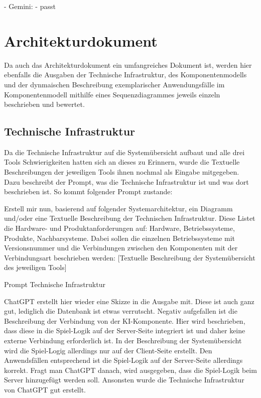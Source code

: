 - Gemini:
    - passt


\section{Architekturdokument}  \label{CompArchitekturdokument}

Da auch das Architekturdokument ein umfangreiches Dokument ist, werden hier ebenfalls die Ausgaben der Technische Infrastruktur, des Komponentenmodells 
und der dynmaischen Beschreibung exemplarischer Anwendungsfälle im Komponentenmodell mithilfe eines Sequenzdiagrammes jeweils einzeln beschrieben und bewertet.

\subsection*{Technische Infrastruktur}

Da die Technische Infrastruktur auf die Systemübersicht aufbaut und alle drei Tools Schwierigkeiten hatten sich an dieses zu Erinnern, wurde die Textuelle 
Beschreibungen der jeweiligen Tools ihnen nochmal als Eingabe mitgegeben. Dazu beschreibt der Prompt, was die Technische Infrastruktur ist und was dort 
beschrieben ist. So kommt folgender Prompt zustande:

\begin{prompt}[H]
    \begin{tcolorbox}[colback=gray!20, colframe=gray!20, boxrule=0pt, sharp corners] 
        Erstell mir nun, basierend auf folgender Systemarchitektur, ein Diagramm und/oder eine Textuelle Beschreibung der Technischen Infrastruktur. 
        Diese Listet die Hardware- und Produktanforderungen auf: Hardware, Betriebssysteme, Produkte, Nachbarsysteme. Dabei sollen die einzelnen 
        Betriebssysteme mit Versionsnummer und die Verbindungen zwischen den Komponenten mit der Verbindungsart beschrieben werden: [Textuelle 
        Beschreibung der Systemübersicht des jeweiligen Tools]
        \vfill
    \end{tcolorbox}
    \caption{Prompt Technische Infrastruktur}
    \label{Prompt Technische Infrastruktur}
\end{prompt}

ChatGPT erstellt hier wieder eine Skizze in die Ausgabe mit. Diese ist auch ganz gut, lediglich die Datenbank ist etwas verrutscht. Negativ aufgefallen
ist die Beschreibung der Verbindung von der KI-Komponente. Hier wird beschrieben, dass diese in die Spiel-Logik auf der Server-Seite integriert ist und 
daher keine externe Verbindung erforderlich ist. In der Beschreibung der Systemübersicht wird die Spiel-Logig allerdings nur auf der Client-Seite erstellt.
Den Anwendsfällen entsprechend ist die Spiel-Logik auf der Server-Seite allerdings korrekt. Fragt man ChatGPT danach, wird ausgegeben, dass die Spiel-Logik 
beim Server hinzugefügt werden soll. Ansonsten wurde die Technische Infrastruktur von ChatGPT gut erstellt.\\

